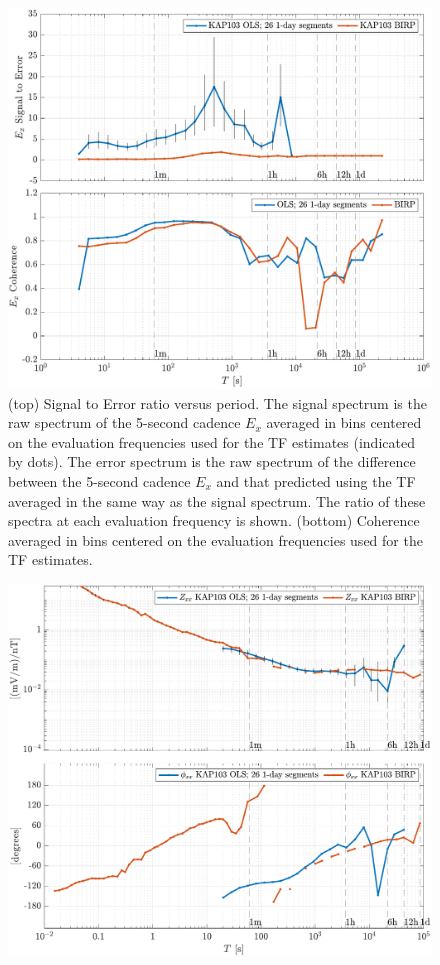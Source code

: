 \documentclass{article}
\begin{document}
\begin{figure}[h!]
\centering
\includegraphics[width=\textwidth]{figures/KAP103/SN_compare-E_x.pdf}
\caption{(top) Signal to Error ratio versus period. The signal spectrum is the raw spectrum of the 5-second cadence $E_x$ averaged in bins centered on the evaluation frequencies used for the TF estimates (indicated by dots). The error spectrum is the raw spectrum of the difference between the 5-second cadence $E_x$ and that predicted using the TF averaged in the same way as the signal spectrum. The ratio of these spectra at each evaluation frequency is shown. (bottom) Coherence averaged in bins centered on the evaluation frequencies used for the TF estimates.}
\label{fig:universe}
\end{figure}

\clearpage

\begin{figure}[h!]
\centering
\includegraphics[width=\textwidth]{figures/KAP103/transferfnZ_compare-Z_xx_Magnitude_Phase.pdf}
\caption{}
\end{figure}
\end{document}
